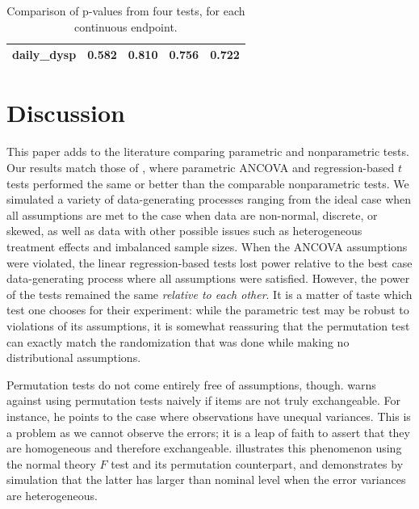 \documentclass[12pt]{article}
\begin{document}
\begin{table}[]
\begin{tabular}{l|cccc}
daily\_dysp   & 0.582                      & 0.810                                                                                & 0.756                                                                        & 0.722                                                                        \\
\hline
\end{tabular}
\caption{Comparison of p-values from four tests, for each continuous endpoint.} 
\end{table}

\section{Discussion}

This paper adds to the literature comparing parametric and nonparametric tests.
Our results match those of \cite{vickers_parametric_2005, anderson_empirical_1999}, where parametric ANCOVA and regression-based $t$ tests performed the same or better than the comparable nonparametric tests.
We simulated a variety of data-generating processes ranging from the ideal case when all assumptions are met 
to the case when data are non-normal, discrete, or skewed,
as well as data with other possible issues such as heterogeneous treatment effects and imbalanced sample sizes.
When the ANCOVA assumptions were violated, the linear regression-based tests lost power relative to the best case data-generating process where all assumptions were satisfied.
However, the power of the tests remained the same \textit{relative to each other}.
It is a matter of taste which test one chooses for their experiment: while the parametric test may be robust to violations of its assumptions, it is somewhat reassuring that the permutation test can exactly match the randomization that was done while making no distributional assumptions.

Permutation tests do not come entirely free of assumptions, though.  
\cite{romano_behavior_1990} warns against using permutation tests naively if items are not truly exchangeable. 
For instance, he points to the case where observations have unequal variances.  
This is a problem as we cannot observe the errors; it is a leap of faith to assert that they are homogeneous and therefore exchangeable.
\cite{boik_fisherpitman_1987} illustrates this phenomenon using the normal theory $F$ test and its permutation counterpart, 
and demonstrates by simulation that the latter has larger than nominal level when the error variances are heterogeneous.
\end{document}

